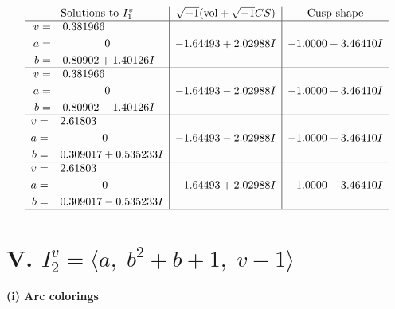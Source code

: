 \documentclass[1p]{elsarticle_modified}
\theoremstyle{definition}
\newcommand{\I}{\sqrt{-1}}
\begin{document}
$$\begin{array}{c|c|c}  
\text{Solutions to }I^v_{1}& \I (\text{vol} + \sqrt{-1}CS) & \text{Cusp shape}\\
 \hline 
\begin{aligned}
v &= \phantom{-}0.381966\phantom{ +0.000000I} \\
a &= \phantom{-0.000000 } 0 \\
b &= -0.80902 + 1.40126 I\end{aligned}
 & -1.64493 + 2.02988 I & -1.0000 - 3.46410 I \\ \hline\begin{aligned}
v &= \phantom{-}0.381966\phantom{ +0.000000I} \\
a &= \phantom{-0.000000 } 0 \\
b &= -0.80902 - 1.40126 I\end{aligned}
 & -1.64493 - 2.02988 I & -1.0000 + 3.46410 I \\ \hline\begin{aligned}
v &= \phantom{-}2.61803\phantom{ +0.000000I} \\
a &= \phantom{-0.000000 } 0 \\
b &= \phantom{-}0.309017 + 0.535233 I\end{aligned}
 & -1.64493 - 2.02988 I & -1.0000 + 3.46410 I \\ \hline\begin{aligned}
v &= \phantom{-}2.61803\phantom{ +0.000000I} \\
a &= \phantom{-0.000000 } 0 \\
b &= \phantom{-}0.309017 - 0.535233 I\end{aligned}
 & -1.64493 + 2.02988 I & -1.0000 - 3.46410 I\\
 \hline 
 \end{array}$$\newpage\newpage\renewcommand{\arraystretch}{1}
\centering \section*{V. $I^v_{2}= \langle a,\;b^2+b+1,\;v-1 \rangle$}
\flushleft \textbf{(i) Arc colorings}\\
\end{document}
